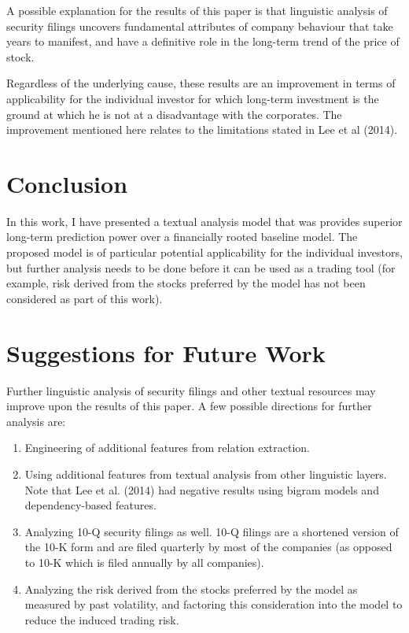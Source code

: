 \documentclass[11pt,a4paper]{article}
\begin{document}
A possible explanation for the results of this paper is that linguistic analysis of security filings uncovers fundamental attributes of company behaviour that take years to manifest, and have a definitive role in the long-term trend of the price of stock.   

Regardless of the underlying cause, these results are an improvement in terms of applicability for the individual investor for which long-term investment is the ground at which he is not at a disadvantage with the corporates. The improvement mentioned here relates to the limitations stated in Lee et al (2014).

\section{Conclusion}
In this work, I have presented a textual analysis model that was provides superior long-term prediction power over a financially rooted baseline model. The proposed model is of particular potential applicability for the individual investors, but further analysis needs to be done before it can be used as a trading tool (for example, risk derived from the stocks preferred by the model has not been considered as part of this work).

\section{Suggestions for Future Work}
Further linguistic analysis of security filings and other textual resources may improve upon the results of this paper. A few possible directions for further analysis are:
\begin{enumerate}
  \item Engineering of additional features from relation extraction.
  \item Using additional features from textual analysis from other linguistic layers. Note that Lee et al. (2014) had negative results using bigram models and dependency-based features.
  \item Analyzing 10-Q security filings as well. 10-Q filings are a shortened version of the 10-K form and are filed quarterly by most of the companies (as opposed to 10-K which is filed annually by all companies).
  \item Analyzing the risk derived from the stocks preferred by the model as measured by past volatility, and factoring this consideration into the model to reduce the induced trading risk.
\end{enumerate}
\end{document}
